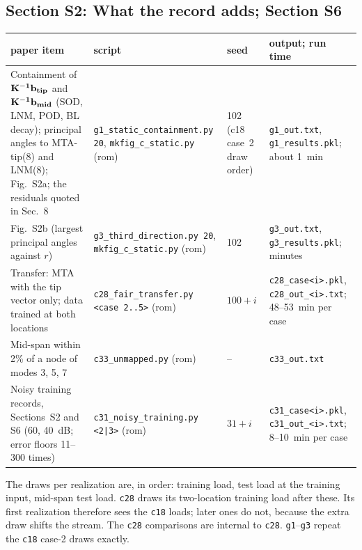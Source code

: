 \documentclass[10pt]{article}
\newcommand{\f}[1]{\texttt{#1}}
\begin{document}
\subsection*{Section S2: What the record adds; Section S6}
\begin{longtable}{L{0.31\textwidth}L{0.25\textwidth}L{0.08\textwidth}L{0.25\textwidth}}
\toprule
paper item & script & seed & output; run time\\ \midrule
Containment of $\bf K^{-1}b_{tip}$ and $\bf K^{-1}b_{mid}$ (SOD, LNM, POD, BL decay); principal angles to MTA-tip(8) and LNM(8); Fig.~S2a; the residuals quoted in Sec.~8 & \f{g1\_\allowbreak{}static\_\allowbreak{}containment.py 20}, \f{mkfig\_\allowbreak{}c\_\allowbreak{}static.py} (rom) & 102 (c18 case~2 draw order) & \f{g1\_\allowbreak{}out.txt}, \f{g1\_\allowbreak{}results.pkl}; about 1~min\\
Fig.~S2b (largest principal angles against $r$) & \f{g3\_\allowbreak{}third\_\allowbreak{}direction.py 20}, \f{mkfig\_\allowbreak{}c\_\allowbreak{}static.py} (rom) & 102 & \f{g3\_\allowbreak{}out.txt}, \f{g3\_\allowbreak{}results.pkl}; minutes\\
Transfer: MTA with the tip vector only; data trained at both locations & \f{c28\_\allowbreak{}fair\_\allowbreak{}transfer.py <case 2..5>} (rom) & $100+i$ & \f{c28\_\allowbreak{}case<i>.pkl}, \f{c28\_\allowbreak{}out\_\allowbreak{}<i>.txt}; 48--53~min per case\\
Mid-span within 2\% of a node of modes 3, 5, 7 & \f{c33\_\allowbreak{}unmapped.py} (rom) & -- & \f{c33\_\allowbreak{}out.txt}\\
Noisy training records, Sections~S2 and S6 (60, 40~dB; error floors 11--300 times) & \f{c31\_\allowbreak{}noisy\_\allowbreak{}training.py <2|3>} (rom) & $31+i$ & \f{c31\_\allowbreak{}case<i>.pkl}, \f{c31\_\allowbreak{}out\_\allowbreak{}<i>.txt}; 8--10~min per case\\
\bottomrule
\end{longtable}
The draws per realization are, in order: training load, test load at the training input, mid-span test load. \f{c28} draws its two-location training load after these. Its first realization therefore sees the \f{c18} loads; later ones do not, because the extra draw shifts the stream. The \f{c28} comparisons are internal to \f{c28}. \f{g1}--\f{g3} repeat the \f{c18} case-2 draws exactly.
\end{document}
